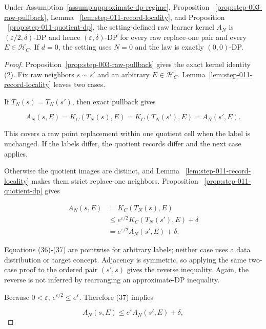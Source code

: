 \begin{proposition}\label{prop:step-011-raw-dp}
Under Assumption~\ref{assump:approximate-dp-regime}, Proposition
~\ref{prop:step-003-raw-pullback}, Lemma
~\ref{lem:step-011-record-locality}, and Proposition
~\ref{prop:step-011-quotient-dp}, the setting-defined raw learner kernel
\(A_N\) is \((\varepsilon/2,\delta)\)-DP and hence
\((\varepsilon,\delta)\)-DP for every raw replace-one pair and every
\(E\in\mathcal H_C\). If \(d=0\), the setting uses \(N=0\) and the law is
exactly \((0,0)\)-DP.


\end{proposition}

\begin{proof}
Proposition~\ref{prop:step-003-raw-pullback} gives the
exact kernel identity (2). Fix raw neighbors \(s\sim s'\) and an arbitrary
\(E\in\mathcal H_C\). Lemma~\ref{lem:step-011-record-locality} leaves two
cases.

If \(T_N(s)=T_N(s')\), then exact pullback gives

\[
 A_N(s,E)=K_C(T_N(s),E)
         =K_C(T_N(s'),E)=A_N(s',E).
\tag{36}
\]

This covers a raw point replacement within one quotient cell when the
label is unchanged. If the labels differ, the quotient records differ and
the next case applies.

Otherwise the quotient images are distinct, and Lemma
~\ref{lem:step-011-record-locality} makes them strict replace-one neighbors.
Proposition
~\ref{prop:step-011-quotient-dp} gives

\[
\begin{aligned}
 A_N(s,E)
 &=K_C(T_N(s),E)\\
 &\leq e^{\varepsilon/2}K_C(T_N(s'),E)+\delta\\
 &=e^{\varepsilon/2}A_N(s',E)+\delta.
\end{aligned}
\tag{37}
\]

Equations (36)-(37) are pointwise for arbitrary labels; neither case uses a
data distribution or target concept. Adjacency is symmetric, so applying
the same two-case proof to the ordered pair \((s',s)\) gives the reverse
inequality. Again, the reverse is not inferred by rearranging an
approximate-DP inequality.

Because \(0<\varepsilon\),
\(e^{\varepsilon/2}\leq e^\varepsilon\). Therefore (37) implies

\[
 A_N(s,E)\leq e^\varepsilon A_N(s',E)+\delta,
\tag{38}
\]


\end{proof}
